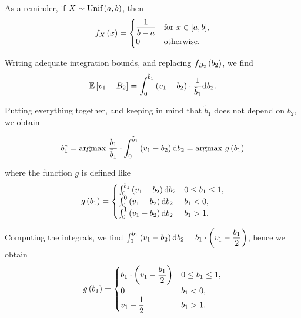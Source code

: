 As a reminder, if $X \sim \text{Unif} \left(a, b\right)$, then
\begin{equation*}
f_{X}\left(x\right) =
    \begin{cases}
        \dfrac{1}{b-a}  & {\text{for }} x \in [a,b], \\
        0               & {\text{otherwise}}.
    \end{cases}
\end{equation*}


Writing adequate integration bounds, and replacing $f_{B_2} \left(b_2\right)$, we find
\begin{equation*}
    \mathbb{E} \left[v_1 - B_2\right]
    = \int_{0}^{\tilde{b}_1} \left(v_1 - b_2\right) \cdot \dfrac{1}{\tilde{b}_1} \mathrm{d} b_2.
\end{equation*}

Putting everything together, and keeping in mind that $\tilde{b}_1$ does not depend on $b_2$, we obtain

\begin{equation*}
    b_1^{*}
    = \text{argmax} \ \dfrac{\tilde{b}_1}{\tilde{b}_1} \cdot \int_{0}^{\tilde{b}_1} \left(v_1 - b_2\right) \mathrm{d} b_2
    = \text{argmax} \ g \left(b_1\right)
\end{equation*}

where the function $g$ is defined like
\begin{equation*}
    g \left(b_1\right)
    =
    \begin{cases}
       \int_{0}^{b_1} \left(v_1 - b_2\right) \mathrm{d} b_2     & 0 \leq b_1 \leq 1, \\
       \int_{0}^{0} \left(v_1 - b_2\right) \mathrm{d} b_2       & b_1 < 0, \\
       \int_{0}^{1} \left(v_1 - b_2\right) \mathrm{d} b_2       & b_1 > 1. \\
     \end{cases}
\end{equation*}

Computing the integrals, we find $\int_{0}^{b_1} \left(v_1 - b_2\right) \mathrm{d} b_2 = b_1 \cdot \left(v_1 - \dfrac{b_1}{2}\right)$, hence we obtain
\begin{equation*}
    g \left(b_1\right)
    =
    \begin{cases}
       b_{1} \cdot \left(v_1 - \dfrac{b_1}{2}\right)    & 0 \leq b_1 \leq 1, \\
       0                                            & b_1 < 0, \\
       v_1 - \dfrac{1}{2}                           & b_1 > 1. \\
     \end{cases}
\end{equation*}


